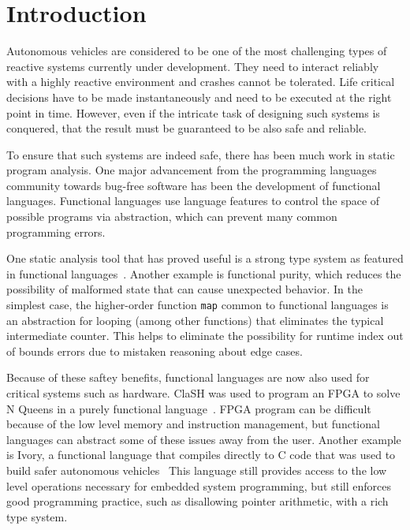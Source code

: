 \section{Introduction}

Autonomous vehicles are considered to be one of the most challenging types of reactive systems currently under development. 
They need to interact reliably with a highly reactive environment and crashes cannot be tolerated.
Life critical decisions have to be made instantaneously and need to be executed at the right point in time. 
However, even if the intricate task of designing such systems is conquered, that the result must be guaranteed to be also safe and reliable.

To ensure that such systems are indeed safe, there has been much work in static program analysis.
One major advancement from the programming languages community towards bug-free software has been the development of functional languages.
Functional languages use language features to control the space of possible programs via abstraction, which can prevent many common programming errors.

One static analysis tool that has proved useful is a strong type system as featured in functional languages~\cite{cardelli1996type}.
Another example is functional purity, which reduces the possibility of malformed state that can cause unexpected behavior.
In the simplest case, the higher-order function \texttt{map} common to functional languages is an abstraction for looping (among other functions) that eliminates the typical intermediate counter.
This helps to eliminate the possibility for runtime index out of bounds errors due to mistaken reasoning about edge cases.

Because of these saftey benefits, functional languages are now also used for critical systems such as hardware.
ClaSH was used to program an FPGA to solve N Queens in a purely functional language~\cite{clash2014}.
FPGA program can be difficult because of the low level memory and instruction management, but functional languages can abstract some of these issues away from the user.
Another example is Ivory, a functional language that compiles directly to C code that was used to build safer autonomous vehicles~\cite{pike2014}
This language still provides access to the low level operations necessary for embedded system programming, but still enforces good programming practice, such as disallowing pointer arithmetic, with a rich type system.

